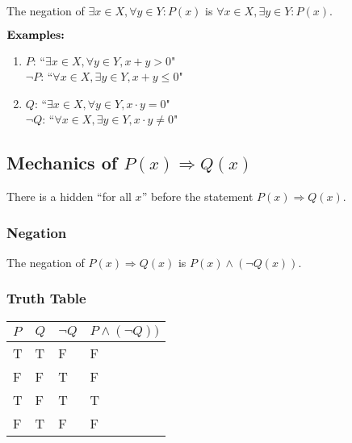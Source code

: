 \documentclass{article}
\begin{document}
The negation of $\exists x \in X, \forall y \in Y \colon P(x)$ is $\forall x \in X, \exists y \in Y \colon P(x)$.

$\hfill \break \textbf{Examples:}$

\begin{enumerate}
    \item $P$: ``$\exists x \in X, \forall y \in Y, x + y > 0$" \\
    $\lnot P$: ``$\forall x \in X, \exists y \in Y, x + y \leq 0$"

    \item $Q$: ``$\exists x \in X, \forall y \in Y, x \cdot y = 0$" \\
    $\lnot Q$: ``$\forall x \in X, \exists y \in Y, x \cdot y \not = 0$"
\end{enumerate}

\subsection{Mechanics of $P(x) \Rightarrow Q(x)$}

There is a hidden ``for all $x$'' before the statement $P(x) \Rightarrow Q(x)$.

\subsubsection{Negation}

The negation of $P(x) \Rightarrow Q(x)$ is $P(x) \land (\lnot Q(x))$.

\subsubsection{Truth Table}

\begin{table}[!htb]
    \begin{tabular}{|l|l|l|l|}
    \hline
    \textbf{$P$} & \textbf{$Q$} & \textbf{$\lnot Q$} & \textbf{$P \land (\lnot Q))$}      \\ \hline
    T          & T          & F              & \cellcolor[HTML]{67FD9A}F \\ \hline
    F          & F          & T              & \cellcolor[HTML]{67FD9A}F \\ \hline
    T          & F          & T              & \cellcolor[HTML]{67FD9A}T \\ \hline
    F          & T          & F              & \cellcolor[HTML]{67FD9A}F \\ \hline
    \end{tabular}
\end{table}
\end{document}
